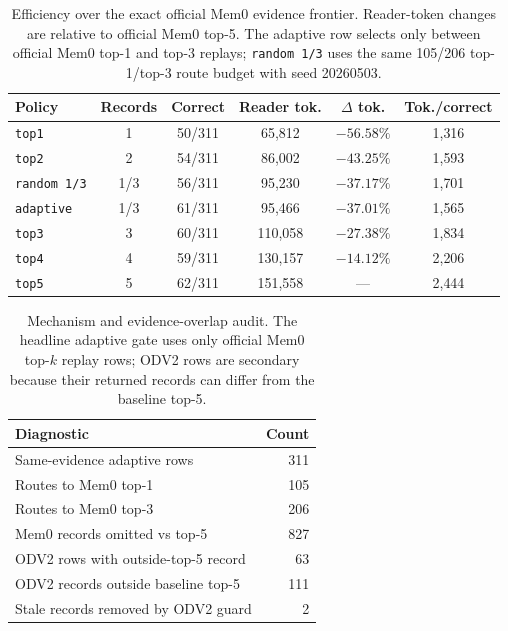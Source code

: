 \documentclass{article}
\begin{document}
\begin{table}[t]
\caption{Efficiency over the exact official Mem0 evidence frontier. Reader-token changes are relative to official Mem0 top-5. The adaptive row selects only between official Mem0 top-1 and top-3 replays; \texttt{random 1/3} uses the same 105/206 top-1/top-3 route budget with seed 20260503.}
\label{tab:token_budget}
\vskip 0.15in
\begin{center}
\begin{tiny}
\begin{sc}
\begin{tabular}{lccccc}
\toprule
Policy & Records & Correct & Reader tok. & $\Delta$ tok. & Tok./correct \\
\midrule
\texttt{top1} & 1 & 50/311 & 65{,}812 & $-56.58\%$ & 1{,}316 \\
\texttt{top2} & 2 & 54/311 & 86{,}002 & $-43.25\%$ & 1{,}593 \\
\texttt{random 1/3} & 1/3 & 56/311 & 95{,}230 & $-37.17\%$ & 1{,}701 \\
\texttt{adaptive} & 1/3 & 61/311 & 95{,}466 & $-37.01\%$ & 1{,}565 \\
\texttt{top3} & 3 & 60/311 & 110{,}058 & $-27.38\%$ & 1{,}834 \\
\texttt{top4} & 4 & 59/311 & 130{,}157 & $-14.12\%$ & 2{,}206 \\
\texttt{top5} & 5 & 62/311 & 151{,}558 & --- & 2{,}444 \\
\bottomrule
\end{tabular}
\end{sc}
\end{tiny}
\end{center}
\vskip -0.1in
\end{table}

\begin{table}[t]
\caption{Mechanism and evidence-overlap audit. The headline adaptive gate uses only official Mem0 top-$k$ replay rows; ODV2 rows are secondary because their returned records can differ from the baseline top-5.}
\label{tab:mechanism_attribution}
\vskip 0.15in
\begin{center}
\begin{scriptsize}
\begin{sc}
\begin{tabular}{lr}
\toprule
Diagnostic & Count \\
\midrule
Same-evidence adaptive rows & 311 \\
Routes to Mem0 top-1 & 105 \\
Routes to Mem0 top-3 & 206 \\
Mem0 records omitted vs top-5 & 827 \\
ODV2 rows with outside-top-5 record & 63 \\
ODV2 records outside baseline top-5 & 111 \\
Stale records removed by ODV2 guard & 2 \\
\bottomrule
\end{tabular}
\end{sc}
\end{scriptsize}
\end{center}
\vskip -0.1in
\end{table}
\end{document}
